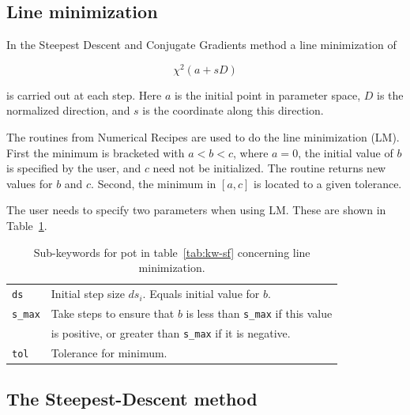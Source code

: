 \documentclass[a4paper,12pt,onecolumn]{article}
\begin{document}
\subsection{Line minimization}


In the Steepest Descent and Conjugate Gradients method a line
minimization of

\begin{equation}
\chi^2(a + s D)
\end{equation}

is carried out at each step. Here $a$ is the initial point in
parameter space, $D$ is the normalized direction, and $s$ is the
coordinate along this direction.

The routines from Numerical Recipes are used to do the
line minimization (LM). First the minimum is bracketed
with $a < b < c$, where $a=0$, the initial value of $b$ is
specified by the user, and $c$ need not be initialized.
The routine returns new values for $b$ and $c$.
Second, the minimum in $[a,c]$ is located to a given tolerance.

The user needs to specify two parameters when using LM. These
are shown in Table~\ref{tab:LMpar}.



\begin{table}[!h]
\caption{
Sub-keywords for \textrm{pot} in table~\ref{tab:kw-sf}
concerning line minimization.
\label{tab:LMpar}
}
\begin{center}
\begin{tabular}{|l|l|}
\hline
\hline
\verb+ds+           & Initial step size $ds_i$. Equals initial value for $b$. \\
\verb+s_max+        & Take steps to ensure that $b$ is less than \verb+s_max+ if this value \\
                    & is positive, or greater than \verb+s_max+ if it is negative. \\
\verb+tol+          & Tolerance for minimum. \\
\hline
\hline
\end{tabular}
\end{center}
\end{table}
















\subsection{The Steepest-Descent method}
\end{document}
